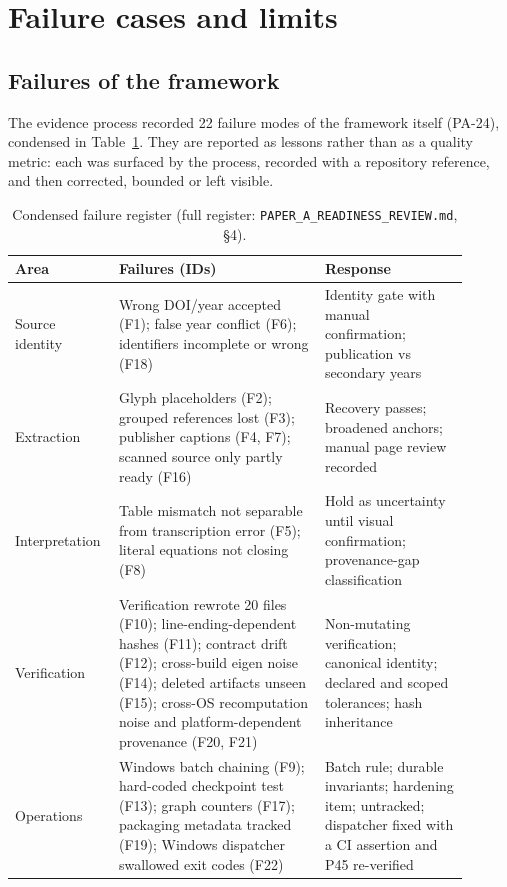 \section{Failure cases and limits}
\label{sec:failures}

\subsection{Failures of the framework}
The evidence process recorded 22 failure modes of the framework itself (PA-24), condensed in Table~\ref{tab:failures}. They are reported as lessons rather than as a quality metric: each was surfaced by the process, recorded with a repository reference, and then corrected, bounded or left visible.

\begin{table}[htbp]
\centering
\caption{Condensed failure register (full register: \texttt{PAPER\_A\_READINESS\_REVIEW.md}, \S4).}
\label{tab:failures}
\footnotesize\setlength{\tabcolsep}{3pt}
\begin{tabular}{>{\raggedright\arraybackslash}p{0.17\linewidth}>{\raggedright\arraybackslash}p{0.43\linewidth}>{\raggedright\arraybackslash}p{0.30\linewidth}}
\toprule
Area & Failures (IDs) & Response \\
\midrule
Source identity & Wrong DOI/year accepted (F1); false year conflict (F6); identifiers incomplete or wrong (F18) & Identity gate with manual confirmation; publication vs secondary years \\
Extraction & Glyph placeholders (F2); grouped references lost (F3); publisher captions (F4, F7); scanned source only partly ready (F16) & Recovery passes; broadened anchors; manual page review recorded \\
Interpretation & Table mismatch not separable from transcription error (F5); literal equations not closing (F8) & Hold as uncertainty until visual confirmation; provenance-gap classification \\
Verification & Verification rewrote 20 files (F10); line-ending-dependent hashes (F11); contract drift (F12); cross-build eigen noise (F14); deleted artifacts unseen (F15); cross-OS recomputation noise and platform-dependent provenance (F20, F21) & Non-mutating verification; canonical identity; declared and scoped tolerances; hash inheritance \\
Operations & Windows batch chaining (F9); hard-coded checkpoint test (F13); graph counters (F17); packaging metadata tracked (F19); Windows dispatcher swallowed exit codes (F22) & Batch rule; durable invariants; hardening item; untracked; dispatcher fixed with a CI assertion and P45 re-verified \\
\bottomrule
\end{tabular}
\end{table}

